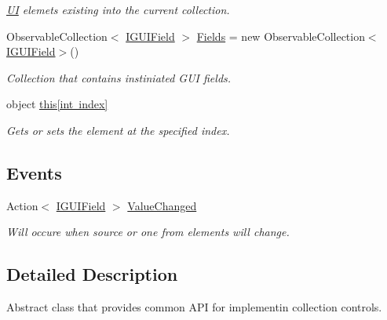 \begin{DoxyCompactItemize}
\begin{DoxyCompactList}\small\item\em \mbox{\hyperlink{namespace_wpf_handler_1_1_u_i}{UI}} elemets existing into the current collection. \end{DoxyCompactList}\item 
Observable\+Collection$<$ \mbox{\hyperlink{interface_wpf_handler_1_1_u_i_1_1_auto_layout_1_1_i_g_u_i_field}{I\+G\+U\+I\+Field}} $>$ \mbox{\hyperlink{class_wpf_handler_1_1_u_i_1_1_controls_1_1_collection_control_a47291558ce667430c006d9e294f714bb}{Fields}} = new Observable\+Collection$<$\mbox{\hyperlink{interface_wpf_handler_1_1_u_i_1_1_auto_layout_1_1_i_g_u_i_field}{I\+G\+U\+I\+Field}}$>$()
\begin{DoxyCompactList}\small\item\em Collection that contains instiniated G\+UI fields. \end{DoxyCompactList}\item 
object \mbox{\hyperlink{class_wpf_handler_1_1_u_i_1_1_controls_1_1_collection_control_ade95cee1fcd80188e8b5e5a15b33d43f}{this\mbox{[}int index\mbox{]}}}
\begin{DoxyCompactList}\small\item\em Gets or sets the element at the specified index. \end{DoxyCompactList}\end{DoxyCompactItemize}
\subsection*{Events}
\begin{DoxyCompactItemize}
\item 
Action$<$ \mbox{\hyperlink{interface_wpf_handler_1_1_u_i_1_1_auto_layout_1_1_i_g_u_i_field}{I\+G\+U\+I\+Field}} $>$ \mbox{\hyperlink{class_wpf_handler_1_1_u_i_1_1_controls_1_1_collection_control_a7c24ead5af7dadce18f017f0a93706a2}{Value\+Changed}}
\begin{DoxyCompactList}\small\item\em Will occure when source or one from elements will change. \end{DoxyCompactList}\end{DoxyCompactItemize}


\subsection{Detailed Description}
Abstract class that provides common A\+PI for implementin collection controls. 

